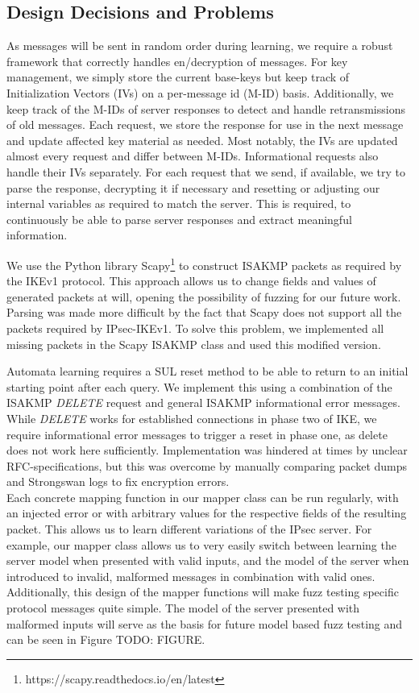 \subsection{Design Decisions and Problems}

As messages will be sent in random order during learning, we require a robust framework that correctly handles en/decryption of messages. For key management, we simply store the current base-keys but keep track of Initialization Vectors (IVs) on a per-message id (M-ID) basis. Additionally, we keep track of the M-IDs of server responses to detect and handle retransmissions of old messages. Each request, we store the response for use in the next message and update affected key material as needed. Most notably, the IVs are updated almost every request and differ between M-IDs. Informational requests also handle their IVs separately. For each request that we send, if available, we try to parse the response, decrypting it if necessary and resetting or adjusting our internal variables as required to match the server. This is required, to continuously be able to parse server responses and extract meaningful information.

We use the Python library Scapy\footnote{https://scapy.readthedocs.io/en/latest} to construct ISAKMP packets as required by the IKEv1 protocol. This approach allows us to change fields and values of generated packets at will, opening the possibility of fuzzing for our future work. Parsing was made more difficult by the fact that Scapy does not support all the packets required by IPsec-IKEv1. To solve this problem, we implemented all missing packets in the Scapy ISAKMP class and used this modified version.

Automata learning requires a SUL reset method to be able to return to an initial starting point after each query. We implement this using a combination of the ISAKMP \emph{DELETE} request and general ISAKMP informational error messages. While \emph{DELETE} works for established connections in phase two of IKE, we require informational error messages to trigger a reset in phase one, as delete does not work here sufficiently. Implementation was hindered at times by unclear RFC-specifications, but this was overcome by manually comparing packet dumps and Strongswan logs to fix encryption errors.\\

Each concrete mapping function in our mapper class can be run regularly, with an injected error or with arbitrary values for the respective fields of the resulting packet. This allows us to learn different variations of the IPsec server. For example, our mapper class allows us to very easily switch between learning the server model when presented with valid inputs, and the model of the server when introduced to invalid, malformed messages in combination with valid ones. Additionally, this design of the mapper functions will make fuzz testing specific protocol messages quite simple. The model of the server presented with malformed inputs will serve as the basis for future model based fuzz testing and can be seen in Figure TODO: FIGURE.

